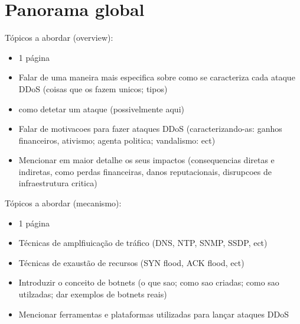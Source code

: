 \section{Panorama global}
Tópicos a abordar (overview):
\begin{itemize}
    \item 1 página
    \item Falar de uma maneira mais especifica sobre como se caracteriza cada ataque DDoS (coisas que os fazem unicos; tipos)
    \item como detetar um ataque (possivelmente aqui)
    \item Falar de motivacoes para fazer ataques DDoS (caracterizando-as: ganhos financeiros, ativismo; agenta politica; vandalismo: ect)
    \item Mencionar em maior detalhe os seus impactos (consequencias diretas e indiretas, como perdas financeiras, danos reputacionais, disrupcoes de infraestrutura critica)
\end{itemize}

Tópicos a abordar (mecanismo):
\begin{itemize}
    \item 1 página
    \item Técnicas de amplfiuicação de tráfico (DNS, NTP, SNMP, SSDP, ect)
    \item Técnicas de exaustão de recursos (SYN flood, ACK flood, ect)
    \item Introduzir o conceito de botnets (o que sao; como sao criadas; como sao utilzadas; dar exemplos de botnets reais)
    \item Mencionar ferramentas e plataformas utilizadas para lançar ataques DDoS
\end{itemize}